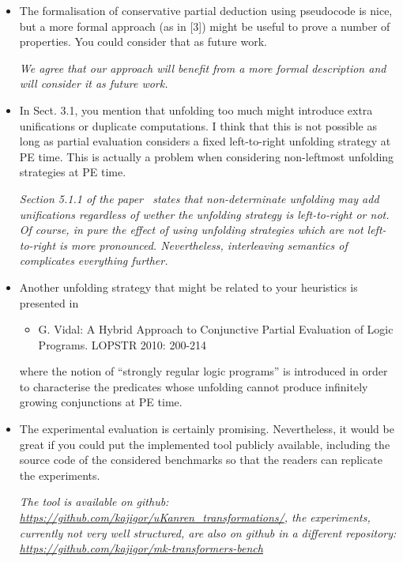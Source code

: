 \begin{itemize}
  \item The formalisation of conservative partial deduction using pseudocode is nice, but a more formal approach (as in [3]) might be useful to prove a number of properties. You could consider that as future work.

  \emph{We agree that our approach will benefit from a more formal description and will consider it as future work.}

  \item{In Sect. 3.1, you mention that unfolding too much might introduce extra unifications or duplicate computations. I think that this is not possible as long as partial evaluation considers a fixed left-to-right unfolding strategy at PE time. This is actually a problem when considering non-leftmost unfolding strategies at PE time.}

  \emph{Section 5.1.1 of the paper~\cite{de1999conjunctive} states that non-determinate unfolding may add unifications regardless of wether the unfolding strategy is left-to-right or not. Of course, in pure \pro the effect of using unfolding strategies which are not left-to-right is more pronounced. Nevertheless, interleaving semantics of \mk complicates everything further.}

  \item Another unfolding strategy that might be related to your heuristics
  is presented in

  \begin{itemize}
    \item G. Vidal: A Hybrid Approach to Conjunctive Partial Evaluation of Logic
    Programs. LOPSTR 2010: 200-214
  \end{itemize}

  where the notion of ``strongly regular logic programs'' is introduced in order to characterise the predicates whose unfolding cannot produce infinitely growing conjunctions at PE time.


  \item {The experimental evaluation is certainly promising. Nevertheless,
  it would be great if you could put the implemented tool publicly available,
  including the source code of the considered benchmarks so that the readers
  can replicate the experiments.}

  \emph{The tool is available on github: \url{https://github.com/kajigor/uKanren_transformations/}, the experiments, currently not very well structured, are also on github in a different repository: \url{https://github.com/kajigor/mk-transformers-bench}}
\end{itemize}
